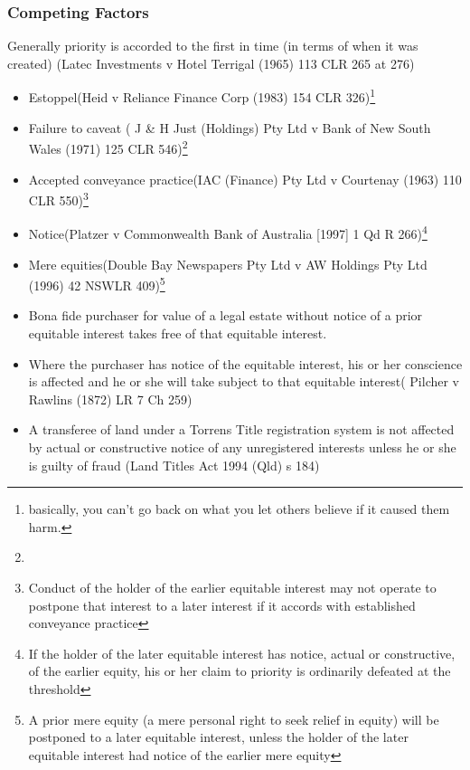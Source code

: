 \subsubsection*{Competing Factors}
Generally priority is accorded to the first in time (in terms of when it was created) (Latec Investments v Hotel Terrigal (1965) 113 CLR 265 at 276)
\begin{itemize}
    \item Estoppel(Heid v Reliance Finance Corp (1983) 154 CLR 326)\footnote{basically, you can’t go back on what you let others believe if it caused them harm.}
    \item Failure to caveat ( J \& H Just (Holdings) Pty Ltd v Bank of New South
Wales (1971) 125 CLR 546)\footnote{}
    \item Accepted conveyance practice(IAC (Finance) Pty Ltd v Courtenay (1963) 110 CLR 550)\footnote{Conduct of the holder of the earlier equitable interest
may not operate to postpone that interest to a later
interest if it accords with established conveyance
practice}
    \item Notice(Platzer v Commonwealth Bank of Australia [1997] 1 Qd R 266)\footnote{If the holder of the later equitable interest has notice,
actual or constructive, of the earlier equity, his or
her claim to priority is ordinarily defeated at the
threshold}
    \item Mere equities(Double Bay Newspapers Pty Ltd v AW Holdings Pty Ltd (1996) 42 NSWLR 409)\footnote{A prior mere equity (a mere personal right to seek relief in
equity) will be postponed to a later equitable interest, unless
the holder of the later equitable interest had notice of the
earlier mere equity}
\end{itemize}
\susubsection*{}
\begin{itemize}
    \item Bona fide purchaser for value of a legal estate without notice of a prior
equitable interest takes free of that equitable interest.
    \item Where the purchaser has notice of the equitable interest, his or her
conscience is affected and he or she will take subject to that equitable
interest( Pilcher v Rawlins (1872) LR 7 Ch 259)
    \item A transferee of land under a Torrens Title registration system is not
affected by actual or constructive notice of any unregistered interests
unless he or she is guilty of fraud (Land Titles Act 1994 (Qld) s 184)
\end{itemize}

